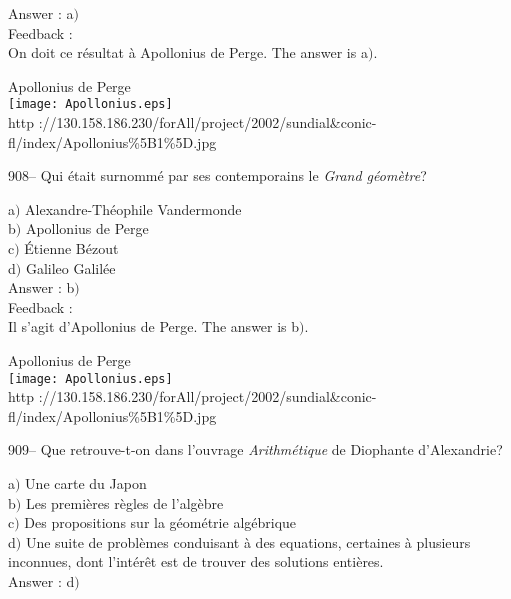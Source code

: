 ﻿\documentclass[letterpaper, 12pt]{article}
\begin{document}
Answer : a$)$\\

Feedback : \\
On doit ce r\'esultat \`a Apollonius de Perge. The answer is a$)$.\\

        \begin{center}
        Apollonius de Perge\\
    \texttt{[image: Apollonius.eps]}\\
        {\footnotesize http
://130.158.186.230/forAll/project/2002/sundial\&conic-fl/index/Apollonius\%5B1\%5D.jpg}
    \end{center}

908-- Qui \'etait surnomm\'e par ses contemporains le {\sl Grand
g\'eom\`etre}?

a$)$ Alexandre-Th\'eophile Vandermonde \\
b$)$ Apollonius de Perge \\
c$)$ \'Etienne B\'ezout \\
d$)$ Galileo Galil\'ee \\

Answer : b$)$\\

Feedback : \\
Il s'agit d'Apollonius de Perge. The answer is b$)$.\\

        \begin{center}
        Apollonius de Perge\\
    \texttt{[image: Apollonius.eps]}\\
        {\footnotesize http
://130.158.186.230/forAll/project/2002/sundial\&conic-fl/index/Apollonius\%5B1\%5D.jpg}
    \end{center}

909-- Que retrouve-t-on dans l'ouvrage {\sl Arithm\'etique} de
Diophante d'Alexandrie?

a$)$ Une carte du Japon \\
b$)$ Les premi\`eres r\`egles de l'alg\`ebre \\
c$)$ Des propositions sur la g\'eom\'etrie alg\'ebrique \\
d$)$ Une suite de probl\`emes conduisant \`a des equations, certaines \`a
plusieurs inconnues,
dont l'int\'er\^et est de trouver des solutions enti\`eres.\\

Answer : d$)$\\
\end{document}
